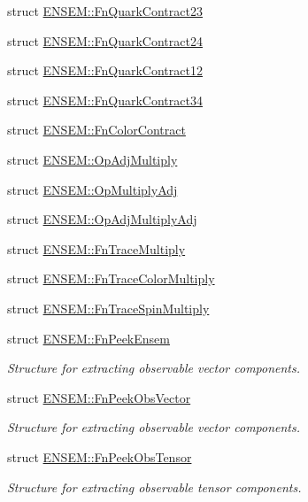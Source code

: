 \begin{DoxyCompactItemize}
\item 
struct \mbox{\hyperlink{structENSEM_1_1FnQuarkContract23}{E\+N\+S\+E\+M\+::\+Fn\+Quark\+Contract23}}
\item 
struct \mbox{\hyperlink{structENSEM_1_1FnQuarkContract24}{E\+N\+S\+E\+M\+::\+Fn\+Quark\+Contract24}}
\item 
struct \mbox{\hyperlink{structENSEM_1_1FnQuarkContract12}{E\+N\+S\+E\+M\+::\+Fn\+Quark\+Contract12}}
\item 
struct \mbox{\hyperlink{structENSEM_1_1FnQuarkContract34}{E\+N\+S\+E\+M\+::\+Fn\+Quark\+Contract34}}
\item 
struct \mbox{\hyperlink{structENSEM_1_1FnColorContract}{E\+N\+S\+E\+M\+::\+Fn\+Color\+Contract}}
\item 
struct \mbox{\hyperlink{structENSEM_1_1OpAdjMultiply}{E\+N\+S\+E\+M\+::\+Op\+Adj\+Multiply}}
\item 
struct \mbox{\hyperlink{structENSEM_1_1OpMultiplyAdj}{E\+N\+S\+E\+M\+::\+Op\+Multiply\+Adj}}
\item 
struct \mbox{\hyperlink{structENSEM_1_1OpAdjMultiplyAdj}{E\+N\+S\+E\+M\+::\+Op\+Adj\+Multiply\+Adj}}
\item 
struct \mbox{\hyperlink{structENSEM_1_1FnTraceMultiply}{E\+N\+S\+E\+M\+::\+Fn\+Trace\+Multiply}}
\item 
struct \mbox{\hyperlink{structENSEM_1_1FnTraceColorMultiply}{E\+N\+S\+E\+M\+::\+Fn\+Trace\+Color\+Multiply}}
\item 
struct \mbox{\hyperlink{structENSEM_1_1FnTraceSpinMultiply}{E\+N\+S\+E\+M\+::\+Fn\+Trace\+Spin\+Multiply}}
\item 
struct \mbox{\hyperlink{structENSEM_1_1FnPeekEnsem}{E\+N\+S\+E\+M\+::\+Fn\+Peek\+Ensem}}
\begin{DoxyCompactList}\small\item\em Structure for extracting observable vector components. \end{DoxyCompactList}\item 
struct \mbox{\hyperlink{structENSEM_1_1FnPeekObsVector}{E\+N\+S\+E\+M\+::\+Fn\+Peek\+Obs\+Vector}}
\begin{DoxyCompactList}\small\item\em Structure for extracting observable vector components. \end{DoxyCompactList}\item 
struct \mbox{\hyperlink{structENSEM_1_1FnPeekObsTensor}{E\+N\+S\+E\+M\+::\+Fn\+Peek\+Obs\+Tensor}}
\begin{DoxyCompactList}\small\item\em Structure for extracting observable tensor components. \end{DoxyCompactList}\item 

\end{DoxyCompactItemize}
